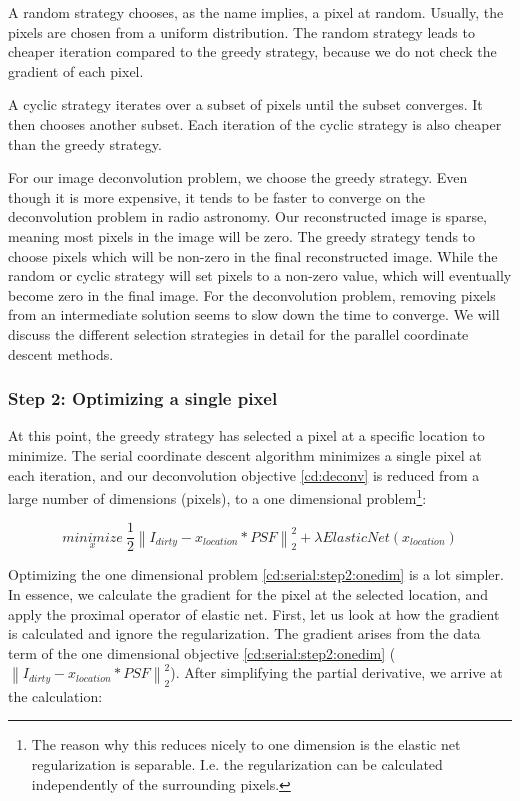 A random strategy chooses, as the name implies, a pixel at random. Usually, the pixels are chosen from a uniform distribution. The random strategy leads to cheaper iteration compared to the greedy strategy, because we do not check the gradient of each pixel.

A cyclic strategy iterates over a subset of pixels until the subset converges. It then chooses another subset. Each iteration of the cyclic strategy is also cheaper than the greedy strategy. 

For our image deconvolution problem, we choose the greedy strategy. Even though it is more expensive, it tends to be faster to converge on the deconvolution problem in radio astronomy. Our reconstructed image is sparse, meaning most pixels in the image will be zero. The greedy strategy tends to choose pixels which will be non-zero in the final reconstructed image. While the random or cyclic strategy will set pixels to a non-zero value, which will eventually become zero in the final image. For the deconvolution problem, removing pixels from an intermediate solution seems to slow down the time to converge. We will discuss the different selection strategies in detail for the parallel coordinate descent methods.


\subsubsection{Step 2: Optimizing a single pixel}
At this point, the greedy strategy has selected a pixel at a specific location to minimize. The serial coordinate descent algorithm minimizes a single pixel at each iteration, and our deconvolution objective \eqref{cd:deconv} is reduced from a large number of dimensions (pixels), to a one dimensional problem\footnote{The reason why this reduces nicely to one dimension is the elastic net regularization is separable. I.e. the regularization can be calculated independently of the surrounding pixels.}:  

\begin{equation}\label{cd:serial:step2:onedim}
\underset{x}{minimize} \: \frac{1}{2} \left \| I_{dirty} - x_{location} * PSF \right \|_2^2 + \lambda ElasticNet(x_{location})
\end{equation}

Optimizing the one dimensional problem \eqref{cd:serial:step2:onedim} is a lot simpler. In essence, we calculate the gradient for the pixel at the selected location, and apply the proximal operator of elastic net. First, let us look at how the gradient is calculated and ignore the regularization. The gradient arises from the data term of the one dimensional objective \eqref{cd:serial:step2:onedim} ($\left \| I_{dirty} - x_{location} * PSF \right \|_2^2$). After simplifying the partial derivative, we arrive at the calculation:


